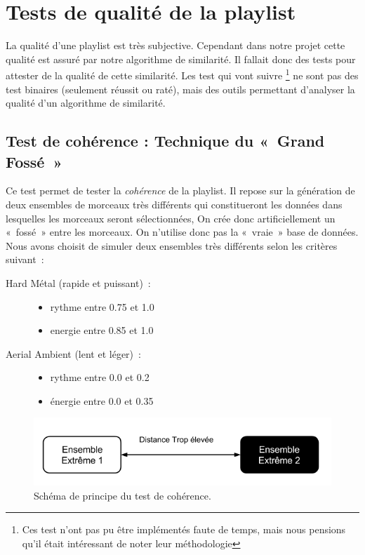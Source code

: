 \section{Tests de qualité de la playlist}
\label{tests:qualite}


La qualité d'une playlist est très subjective. Cependant dans notre projet cette
qualité est assuré par notre algorithme de similarité. Il fallait donc des tests
pour attester de la qualité de cette similarité. Les test qui vont suivre
\footnote{Ces test n'ont pas pu être implémentés faute de temps, mais nous
pensions qu'il était intéressant de noter leur méthodologie} ne sont pas des
test binaires (seulement réussit ou raté), mais des outils permettant d'analyser 
la qualité d'un algorithme de similarité.

\subsection{Test de cohérence : Technique du «~Grand Fossé~»}
\label{tests:qualite:coherence-fosse}

Ce test permet de tester la \emph{cohérence} de la playlist. Il repose sur la
génération de deux ensembles de morceaux très différents qui constitueront les
données dans lesquelles les morceaux seront sélectionnées, On crée donc
artificiellement un «~fossé~» entre les morceaux. On n'utilise donc pas la
«~vraie~» base de données. Nous avons choisit de simuler deux ensembles très
différents selon les critères suivant~:

\begin{description}

\item[Hard Métal (rapide et puissant)~:] \hfill
\begin{itemize}
  \item rythme entre 0.75 et 1.0
  \item energie entre 0.85 et 1.0
\end{itemize}

\item[Aerial Ambient (lent et léger)~:] \hfill
\begin{itemize}
  \item rythme entre 0.0 et 0.2
  \item énergie entre 0.0 et 0.35
\end{itemize}

\end{description}

\begin{figure}[h]
\includegraphics[width=\textwidth]{data/tests/test-coherence-fosse.png}
\caption{Schéma de principe du test de cohérence.}
\end{figure}

